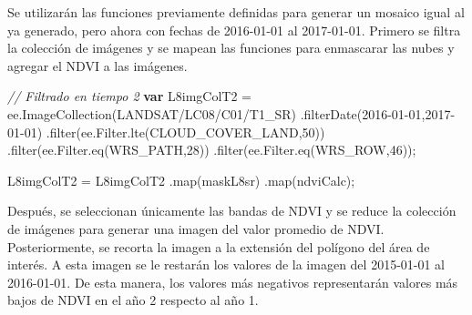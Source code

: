 \documentclass[
  12pt,
  letterpaper,
  twoside]{book}
\newenvironment{Shaded}{\begin{snugshade}}{\end{snugshade}}
\newcommand{\AttributeTok}[1]{\textcolor[rgb]{0.48,0.12,0.64}{#1}}
\newcommand{\CommentTok}[1]{\textcolor[rgb]{0.24,0.58,0.00}{\textit{#1}}}
\newcommand{\ControlFlowTok}[1]{\textcolor[rgb]{0.00,0.00,0.00}{\textbf{#1}}}
\newcommand{\DecValTok}[1]{\textcolor[rgb]{0.28,0.53,0.93}{#1}}
\newcommand{\FunctionTok}[1]{\textcolor[rgb]{0.48,0.12,0.64}{#1}}
\newcommand{\KeywordTok}[1]{\textcolor[rgb]{0.48,0.12,0.64}{#1}}
\newcommand{\NormalTok}[1]{#1}
\newcommand{\OperatorTok}[1]{\textcolor[rgb]{0.00,0.00,0.00}{#1}}
\newcommand{\StringTok}[1]{\textcolor[rgb]{0.87,0.29,0.22}{#1}}
\begin{document}
Se utilizarán las funciones previamente definidas para generar un mosaico igual al ya generado, pero ahora con fechas de 2016-01-01 al 2017-01-01. Primero se filtra la colección de imágenes y se mapean las funciones para enmascarar las nubes y agregar el NDVI a las imágenes.

\begin{Shaded}
\begin{Highlighting}[]
\CommentTok{// Filtrado en tiempo 2}
\ControlFlowTok{var}\NormalTok{ L8imgColT2 }\OperatorTok{=} \KeywordTok{ee}\OperatorTok{.}\FunctionTok{ImageCollection}\NormalTok{(}\StringTok{\textquotesingle{}LANDSAT/LC08/C01/T1\_SR\textquotesingle{}}\NormalTok{)}
  \OperatorTok{.}\FunctionTok{filterDate}\NormalTok{(}\StringTok{\textquotesingle{}2016{-}01{-}01\textquotesingle{}}\OperatorTok{,}\StringTok{\textquotesingle{}2017{-}01{-}01\textquotesingle{}}\NormalTok{)}
  \OperatorTok{.}\FunctionTok{filter}\NormalTok{(}\KeywordTok{ee}\OperatorTok{.}\AttributeTok{Filter}\OperatorTok{.}\FunctionTok{lte}\NormalTok{(}\StringTok{\textquotesingle{}CLOUD\_COVER\_LAND\textquotesingle{}}\OperatorTok{,}\DecValTok{50}\NormalTok{))}
  \OperatorTok{.}\FunctionTok{filter}\NormalTok{(}\KeywordTok{ee}\OperatorTok{.}\AttributeTok{Filter}\OperatorTok{.}\FunctionTok{eq}\NormalTok{(}\StringTok{\textquotesingle{}WRS\_PATH\textquotesingle{}}\OperatorTok{,}\DecValTok{28}\NormalTok{))}
  \OperatorTok{.}\FunctionTok{filter}\NormalTok{(}\KeywordTok{ee}\OperatorTok{.}\AttributeTok{Filter}\OperatorTok{.}\FunctionTok{eq}\NormalTok{(}\StringTok{\textquotesingle{}WRS\_ROW\textquotesingle{}}\OperatorTok{,}\DecValTok{46}\NormalTok{))}\OperatorTok{;}

\NormalTok{L8imgColT2 }\OperatorTok{=}\NormalTok{ L8imgColT2}
  \OperatorTok{.}\FunctionTok{map}\NormalTok{(maskL8sr)}
  \OperatorTok{.}\FunctionTok{map}\NormalTok{(ndviCalc)}\OperatorTok{;}
\end{Highlighting}
\end{Shaded}

Después, se seleccionan únicamente las bandas de NDVI y se reduce la colección de imágenes para generar una imagen del valor promedio de NDVI. Posteriormente, se recorta la imagen a la extensión del polígono del área de interés. A esta imagen se le restarán los valores de la imagen del 2015-01-01 al 2016-01-01. De esta manera, los valores más negativos representarán valores más bajos de NDVI en el año 2 respecto al año 1.
\end{document}
